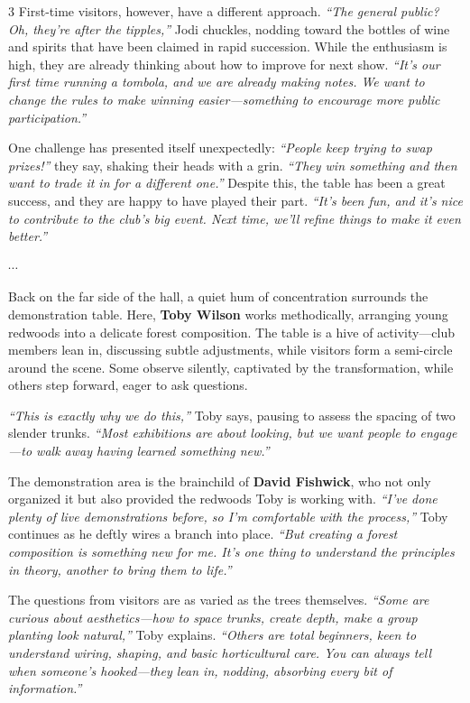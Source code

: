 \begin{multicols}{3}
First\--time visitors, however, have a different approach. \textit{``The general public? Oh, they're after the tipples,''} Jodi chuckles, nodding toward the bottles of wine and spirits that have been claimed in rapid succession. 
While the enthusiasm is high, they are already thinking about how to improve for next show. \textit{``It's our first time running a tombola, and we are already making notes. We want to change the rules to make winning easier---something to encourage more public participation.''}

One challenge has presented itself unexpectedly: \textit{``People keep trying to swap prizes!''} they say, shaking their heads with a grin. \textit{``They win something and then want to trade it in for a different one.''} Despite this, the table has been a great success, and they are happy to have played their part. \textit{``It's been fun, and it's nice to contribute to the club's big event. Next time, we'll refine things to make it even better.''}

\begin{center}
    $\cdots$
\end{center}
\noindent
Back on the far side of the hall, a quiet hum of concentration surrounds the demonstration table. 
Here, \textbf{Toby Wilson} works methodically, arranging young redwoods into a delicate forest composition. 
The table is a hive of activity---club members lean in, discussing subtle adjustments, while visitors form a semi\--circle around the scene. 
Some observe silently, captivated by the transformation, while others step forward, eager to ask questions.

\textit{``This is exactly why we do this,''} Toby says, pausing to assess the spacing of two slender trunks. \textit{``Most exhibitions are about looking, but we want people to engage---to walk away having learned something new.''}

The demonstration area is the brainchild of \textbf{David Fishwick}, who not only organized it but also provided the redwoods Toby is working with. \textit{``I've done plenty of live demonstrations before, so I'm comfortable with the process,''} Toby continues as he deftly wires a branch into place. \textit{``But creating a forest composition is something new for me. It's one thing to understand the principles in theory, another to bring them to life.''}

The questions from visitors are as varied as the trees themselves. \textit{``Some are curious about aesthetics---how to space trunks, create depth, make a group planting look natural,''} Toby explains. \textit{``Others are total beginners, keen to understand wiring, shaping, and basic horticultural care. You can always tell when someone's hooked---they lean in, nodding, absorbing every bit of information.''}


\end{multicols}
